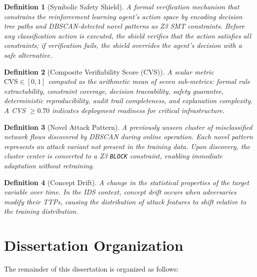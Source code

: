 \documentclass[12pt, letterpaper, oneside]{report}
\newtheorem{definition}{Definition}[chapter]
\begin{document}
\begin{definition}[Symbolic Safety Shield]
A formal verification mechanism that constrains the reinforcement learning agent's action space by encoding decision tree paths and DBSCAN-detected novel patterns as Z3 SMT constraints. Before any classification action is executed, the shield verifies that the action satisfies all constraints; if verification fails, the shield overrides the agent's decision with a safe alternative.
\end{definition}

\begin{definition}[Composite Verifiability Score (CVS)]
A scalar metric $\text{CVS} \in [0, 1]$ computed as the arithmetic mean of seven sub-metrics: formal rule extractability, constraint coverage, decision traceability, safety guarantee, deterministic reproducibility, audit trail completeness, and explanation complexity. A CVS $\geq 0.70$ indicates deployment readiness for critical infrastructure.
\end{definition}

\begin{definition}[Novel Attack Pattern]
A previously unseen cluster of misclassified network flows discovered by DBSCAN during online operation. Each novel pattern represents an attack variant not present in the training data. Upon discovery, the cluster center is converted to a Z3 \texttt{BLOCK} constraint, enabling immediate adaptation without retraining.
\end{definition}

\begin{definition}[Concept Drift]
A change in the statistical properties of the target variable over time. In the IDS context, concept drift occurs when adversaries modify their TTPs, causing the distribution of attack features to shift relative to the training distribution.
\end{definition}


\section{Dissertation Organization}
\label{sec:organization}

The remainder of this dissertation is organized as follows:
\end{document}
